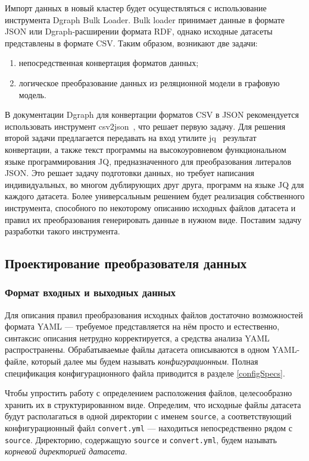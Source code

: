 Импорт данных в новый кластер будет осуществляться с использование инструмента Dgraph Bulk Loader.
Bulk loader принимает данные в формате JSON или Dgraph-расширении формата RDF, однако исходные
датасеты представлены в формате CSV. Таким образом, возникают две задачи:
\begin{enumerate}
    \item непосредственная конвертация форматов данных;
    \item логическое преобразование данных из реляционной модели в графовую модель.
\end{enumerate}
В документации Dgraph для конвертации форматов CSV в JSON рекомендуется использовать инструмент
csv2json~\cite{csv2json}, что решает первую задачу. Для решения второй задачи предлагается передавать на вход
утилите jq~\cite{jq} результат конвертации, а также текст программы на высокоуровневом функциональном языке
программирования JQ, предназначенного для преобразования литералов JSON. Это решает задачу подготовки данных, но
требует написания индивидуальных, во многом дублирующих друг друга, программ на языке JQ для каждого датасета.
Более универсальным решением будет реализация собственного инструмента, способного по некоторому описанию исходных
файлов датасета и правил их преобразования генерировать данные в нужном виде. Поставим задачу разработки такого
инструмента.



\subsection{Проектирование преобразователя данных}


\subsubsection{Формат входных и выходных данных}

Для описания правил преобразования исходных файлов достаточно возможностей формата YAML ---
требуемое представляется на нём просто и естественно, синтаксис описания нетрудно корректируется, а
средства анализа YAML распространены. Обрабатываемые файлы датасета описываются в одном YAML-файле,
который далее мы будем называть \textit{конфигурационным}. Полная спецификация конфигурационного
файла приводится в разделе \ref{configSpecs}.

Чтобы упростить работу с определением расположения файлов, целесообразно хранить их в
структурированном виде. Определим, что исходные файлы датасета будут располагаться в одной
директории с именем \texttt{source}, а соответствующий конфигурационный файл \texttt{convert.yml}
--- находиться непосредственно рядом с \texttt{source}. Директорию, содержащую \texttt{source} и
\texttt{convert.yml}, будем называть \textit{корневой директорией датасета}.

